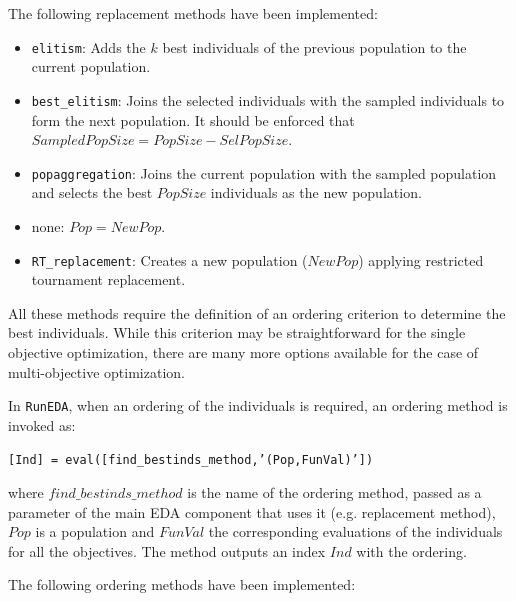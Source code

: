 \documentclass[a4paper]{article}
\begin{document}
The following replacement methods have been  implemented:

\begin{itemize}
 \item \texttt{elitism}: Adds the $k$ best individuals of the previous population
to the current population.
 \item  \texttt{best\_elitism}: Joins the selected individuals with the sampled individuals to form the next
population. It should be enforced that $SampledPopSize = PopSize -
SelPopSize$.
 \item \texttt{popaggregation}: Joins the current population with the sampled population
and selects the best $PopSize$ individuals as the new population.
 \item none: $Pop = NewPop$.
 \item \texttt{RT\_replacement}: Creates a new population ($NewPop$) applying restricted tournament replacement.
\end{itemize}

All these methods require the definition of an ordering criterion to
determine the best individuals. While this criterion may be
straightforward for the single objective optimization, there are
many more options available for the case of multi-objective
optimization.

In  \texttt{RunEDA}, when an ordering of the individuals is
required, an ordering method is invoked as:

\texttt{[Ind]  =
eval([find\_bestinds\_method,'(Pop,FunVal)'])}

where $find\_bestinds\_method$ is the name of the ordering method,
passed as a parameter of the main EDA component that uses it (e.g.
replacement method), $Pop$ is a population and $FunVal$ the
corresponding evaluations of the individuals for all the objectives.
The method outputs an index $Ind$ with the ordering.

The following ordering methods have been  implemented:
\end{document}
